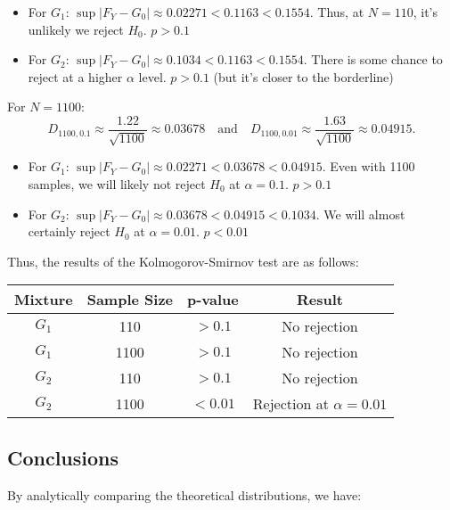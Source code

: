 \documentclass{article}
\begin{document}
\begin{itemize}
    \item For \(G_1\): \(\sup|F_Y-G_0|\approx 0.02271 < 0.1163 < 0.1554\). Thus, at \(N=110\), it's unlikely we reject \(H_0\). \(p > 0.1\)
    \item For \(G_2\): \(\sup|F_Y-G_0|\approx 0.1034 < 0.1163 < 0.1554\). There is some chance to reject at a higher \(\alpha\) level. \(p > 0.1\) (but it's closer to the borderline)
\end{itemize}

For \(N=1100\):
\[
D_{1100,0.1} \approx \frac{1.22}{\sqrt{1100}} \approx 0.03678 \quad \text{and} \quad D_{1100,0.01} \approx \frac{1.63}{\sqrt{1100}} \approx 0.04915.
\]

\begin{itemize}
    \item For \(G_1\): \(\sup|F_Y-G_0|\approx 0.02271 < 0.03678 < 0.04915\). Even with 1100 samples, we will likely not reject \(H_0\) at \(\alpha=0.1\). \(p > 0.1\)
    \item For \(G_2\): \(\sup|F_Y-G_0|\approx 0.03678 < 0.04915 < 0.1034\). We will almost certainly reject \(H_0\) at \(\alpha=0.01\). \(p < 0.01\)
\end{itemize}

Thus, the results of the Kolmogorov-Smirnov test are as follows:

\begin{table}[h]
\centering
\begin{tabular}{|c|c|c|c|}
\hline
\textbf{Mixture} & \textbf{Sample Size} & \textbf{p-value} & \textbf{Result} \\ \hline
\(G_1\) & 110 & \(>0.1\) & No rejection \\ \hline
\(G_1\) & 1100 & \(>0.1\) & No rejection \\ \hline
\(G_2\) & 110 & \(>0.1\) & No rejection \\ \hline
\(G_2\) & 1100 & \(<0.01\) & Rejection at \(\alpha=0.01\) \\ \hline
\end{tabular}
\end{table}

\subsection{Conclusions}

By analytically comparing the theoretical distributions, we have:
\end{document}
